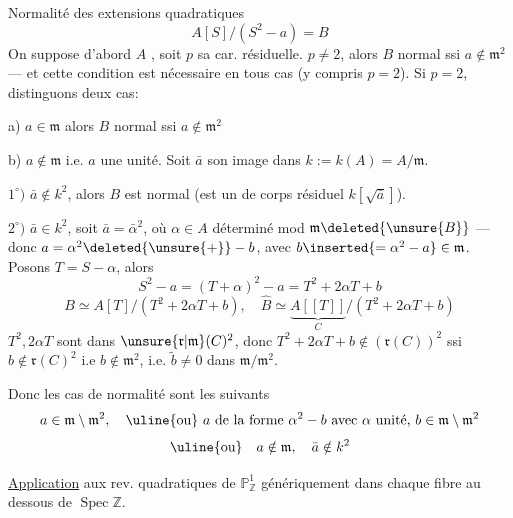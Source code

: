 Normalité des extensions quadratiques
\[
A[S]/(S^2-a)=B
\]
On suppose d'abord $A$ , soit $p$ sa car. résiduelle.
$p\ne2$, alors $B$ normal ssi $a\notin\mathfrak m^2$ --- et cette condition
est nécessaire en tous cas (y compris $p=2$). Si $p=2$, distinguons
deux cas:


a) $a\in\mathfrak m$ alors $B$ normal ssi $a\notin\mathfrak m^2$

b) $a\notin\mathfrak m$ i.e. $a$ une unité. Soit $\bar a$ son image dans
$k:=k(A)=A/\mathfrak m$.

$1^\circ)$ $\bar a\notin k^2$, alors $B$ est normal (est un  de
corps résiduel $k[\sqrt{\bar a}]$).

$2^\circ)$ $\bar a\in k^2$, soit $\bar a=\bar\alpha^2$, où $\alpha\in A$ déterminé mod
$\mathfrak m\deleted{\unsure{B}}$ --- donc
$a=\alpha^2\deleted{\unsure{+}}-b$, avec $b\inserted{={}\alpha^2-a}\in\mathfrak m$.
Posons $T=S-\alpha$, alors
\[
S^2-a=(T+\alpha)^2-a=T^2+2\alpha T+b
\]
\[
B\simeq A[T]/(T^2+2\alpha T+b),\quad
\widehat B\simeq\underbrace{A[[T]]}_{C}/(T^2+2\alpha T+b)
\]
$T^2,2\alpha T$ sont dans $\unsure{\mathfrak r|\mathfrak m}(C)^2$, donc
$T^2+2\alpha T+b\notin(\mathfrak r(C))^2$
ssi $b\notin\mathfrak r(C)^2$ i.e $b\notin\mathfrak m^2$, i.e.
$\widetilde b\ne0$ dans $\mathfrak m/\mathfrak m^2$.

Donc les cas de normalité sont les suivants
\[
a\in\mathfrak m\setminus\mathfrak m^2,\quad
\text{\uline{ou} $a$ de la forme $\alpha^2-b$ avec $\alpha$ unité, $b\in\mathfrak m\setminus\mathfrak m^2$}
\]
\[
\text{\uline{ou}}\quad a\notin\mathfrak m,\quad\bar a\notin k^2
\]

\uline{Application} aux rev. quadratiques de $\mathbb P^1_{\mathbb Z}$
génériquement 
dans chaque fibre au dessous de $\operatorname{Spec}\mathbb Z$.

